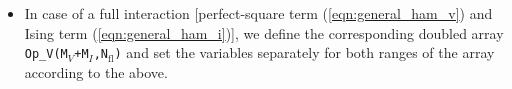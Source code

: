 \begin{itemize}
\item In case of a full interaction [perfect-square term (\ref{eqn:general_ham_v}) and Ising term (\ref{eqn:general_ham_i})],
we  define  the corresponding doubled array \texttt{Op\_V(M$_V$+M$_I$,N$_\mathrm{fl}$)} and set the variables separately for both ranges of the array according to the above.  

\end{itemize}


